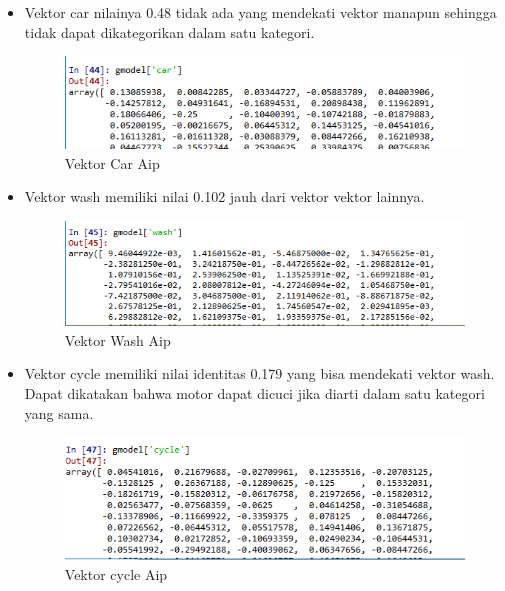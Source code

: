 \begin{itemize}
\item Vektor car nilainya 0.48 tidak ada yang mendekati vektor manapun sehingga tidak dapat dikategorikan dalam satu kategori.
\begin{figure}[ht]
\centering
\includegraphics[scale=0.3]{figures/AIP/e11.PNG}
\caption{Vektor Car Aip}
\label{Praktek}
\end{figure}


\item Vektor wash memiliki nilai 0.102 jauh dari vektor vektor lainnya.
\begin{figure}[ht]
\centering
\includegraphics[scale=0.3]{figures/AIP/e12.PNG}
\caption{Vektor Wash Aip}
\label{Praktek}
\end{figure}


\item Vektor cycle memiliki nilai identitas 0.179 yang bisa mendekati vektor wash. Dapat dikatakan bahwa motor dapat dicuci jika diarti dalam satu kategori yang sama.
\begin{figure}[ht]
\centering
\includegraphics[scale=0.3]{figures/AIP/e14.PNG}
\caption{Vektor cycle Aip}
\label{Praktek}
\end{figure}
\end{itemize}

